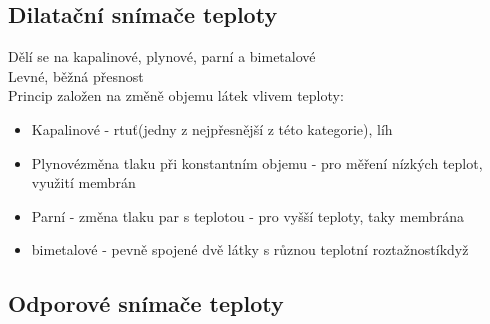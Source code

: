 \subsection*{Dilatační snímače teploty}

Dělí se na kapalinové, plynové, parní a bimetalové\\
Levné, běžná přesnost\\
Princip založen na změně objemu látek vlivem teploty:
\begin{itemize}
    \item Kapalinové - rtuť(jedny z nejpřesnější z této kategorie), líh
    \item Plynovézměna tlaku při konstantním objemu - pro měření nízkých teplot, využití membrán
    \item Parní - změna tlaku par s teplotou - pro vyšší teploty, taky membrána
    \item bimetalové - pevně spojené dvě látky s různou teplotní roztažnostíkdyž
\end{itemize}

\subsection*{Odporové snímače teploty}
